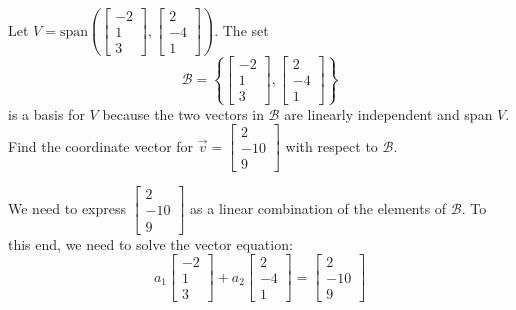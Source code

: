 \documentclass{ximera}
\begin{document}

\begin{example}\label{ex:coordvectorandbasis}
Let $V=\mbox{span}\left(\begin{bmatrix}-2\\1\\3\end{bmatrix},\begin{bmatrix}2\\-4\\1\end{bmatrix}\right)$.  The set $$\mathcal{B}=\left\{\begin{bmatrix}-2\\1\\3\end{bmatrix},\begin{bmatrix}2\\-4\\1\end{bmatrix}\right\}$$ is a basis for $V$ because the two vectors in $\mathcal{B}$ are linearly independent and span $V$.  Find the coordinate vector for $\vec{v}=\begin{bmatrix}2\\-10\\9\end{bmatrix}$ with respect to $\mathcal{B}$.
\begin{explanation}
We need to express $\begin{bmatrix}2\\-10\\9\end{bmatrix}$ as a linear combination of the elements of $\mathcal{B}$.  To this end, we need to solve the vector equation:
 $$a_1\begin{bmatrix}-2\\1\\3\end{bmatrix}+a_2\begin{bmatrix}2\\-4\\1\end{bmatrix}=\begin{bmatrix}2\\-10\\9\end{bmatrix}$$

\end{explanation}
\end{example}
\end{document}
